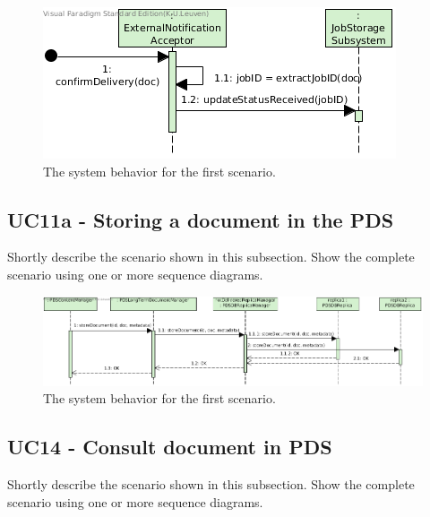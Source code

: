 \begin{figure}[!htp]
    \centering
    \includegraphics[width=\textwidth]{figures/UC10 - Zoomit Receipt Confirmation.png}
    \caption{The system behavior for the first scenario.
        }\label{fig:seq_uc10}
\end{figure}

\subsection{UC11a - Storing a document in the PDS}
Shortly describe the scenario shown in this subsection.
Show the complete scenario using one or more sequence diagrams.

\begin{figure}[!htp]
    \centering
    \includegraphics[width=\textwidth]{figures/UC11a - Storing a document in the PDS.png}
    \caption{The system behavior for the first scenario.
        }\label{fig:seq_uc11a}
\end{figure}

\subsection{UC14 - Consult document in PDS}
Shortly describe the scenario shown in this subsection.
Show the complete scenario using one or more sequence diagrams.

